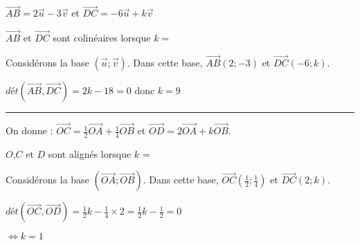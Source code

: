 \documentclass[20pt]{article}
\begin{document}
$\overrightarrow{AB}= 2\overrightarrow{u} - 3\overrightarrow{v}$ et $\overrightarrow{DC}= -6\overrightarrow{u} + k\overrightarrow{v}$  

$\overrightarrow{AB}$ et $\overrightarrow{DC}$ sont colinéaires lorsque $k =$

\vspace{0.4cm}

Considérons la base $(\vec u ; \vec v)$. Dans cette base, $\overrightarrow{AB}(2; - 3)$ et $\overrightarrow{DC}(-6;k)$.

$dét(\overrightarrow{AB},\overrightarrow{DC}) = 2k-18 = 0$ donc $k = 9$

\vspace{1cm}
\hrule 
\vspace{0.4cm} 

On donne : $\overrightarrow{OC}= \frac{1}{2}\overrightarrow{OA}+ \frac{1}{4}\overrightarrow{OB}$ et $\overrightarrow{OD}= 2\overrightarrow{OA}+ k\overrightarrow{OB}$.

$O$,$C$ et $D$ sont alignés lorsque $k$ = 

\vspace{0.4cm}

Considérons la base $(\overrightarrow{OA} ; \overrightarrow{OB})$. Dans cette base, $\overrightarrow{OC}\left(\frac{1}{2}; \frac{1}{4}\right)$ et $\overrightarrow{DC}\left(2;k\right)$.

$dét\left(\overrightarrow{OC},\overrightarrow{OD}\right) = \frac{1}{2}k- \frac{1}{4}\times 2 = \frac{1}{2}k-\frac{1}{2} =0$ 

$\Longleftrightarrow   k = 1$
\end{document}
